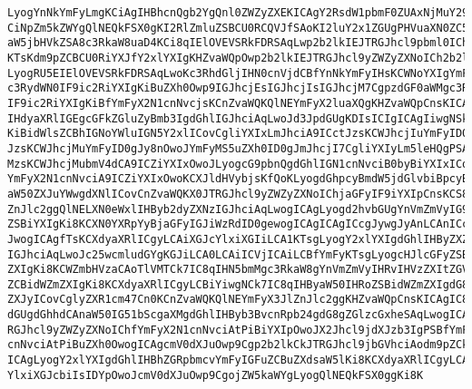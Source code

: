 \begin{verbatim}
LyogYnNkYmFyLmgKCiAgIHBhcnQgb2YgQnl0ZWZyZXEKICAgY2RsdW1pbmF0ZUAxNjMuY29tCiov
CiNpZm5kZWYgQlNEQkFSX0gKI2RlZmluZSBCU0RCQVJfSAoKI2luY2x1ZGUgPHVuaXN0ZC5oPgoj
aW5jbHVkZSA8c3RkaW8uaD4KCi8qIElOVEVSRkFDRSAqLwp2b2lkIEJTRGJhcl9pbml0ICh2b2lk
KTsKdm9pZCBCU0RiYXJfY2xlYXIgKHZvaWQpOwp2b2lkIEJTRGJhcl9yZWZyZXNoICh2b2lkKTsK
LyogRU5EIElOVEVSRkFDRSAqLwoKc3RhdGljIHN0cnVjdCBfYnNkYmFyIHsKCWNoYXIgYmFyOwoJ
c3RydWN0IF9ic2RiYXIgKiBuZXh0Owp9IGJhcjEsIGJhcjIsIGJhcjM7CgpzdGF0aWMgc3RydWN0
IF9ic2RiYXIgKiBfYmFyX2N1cnNvcjsKCnZvaWQKQlNEYmFyX2luaXQgKHZvaWQpCnsKICAgIC8q
IHdyaXRlIGEgcGFkZGluZyBmb3IgdGhlIGJhciAqLwoJd3JpdGUgKDIsICIgICAgIiwgNSk7Cgkv
KiBidWlsZCBhIGNoYWluIGN5Y2xlICovCgliYXIxLmJhciA9ICctJzsKCWJhcjIuYmFyID0gJ1xc
JzsKCWJhcjMuYmFyID0gJy8nOwoJYmFyMS5uZXh0ID0gJmJhcjI7CgliYXIyLm5leHQgPSAmYmFy
MzsKCWJhcjMubmV4dCA9ICZiYXIxOwoJLyogcG9pbnQgdGhlIGN1cnNvciB0byBiYXIxICovCglf
YmFyX2N1cnNvciA9ICZiYXIxOwoKCXJldHVybjsKfQoKLyogdGhpcyBmdW5jdGlvbiBpcyBmb3Ig
aW50ZXJuYWwgdXNlICovCnZvaWQKX0JTRGJhcl9yZWZyZXNoIChjaGFyIF9iYXIpCnsKCS8qIHJl
ZnJlc2ggQlNELXN0eWxlIHByb2dyZXNzIGJhciAqLwogICAgLyogd2hvbGUgYnVmZmVyIG9mIHRo
ZSBiYXIgKi8KCXN0YXRpYyBjaGFyIGJiWzRdID0gewogICAgICAgICcgJywgJyAnLCAnICcsICcg
JwogICAgfTsKCXdyaXRlICgyLCAiXGJcYlxiXGIiLCA1KTsgLyogY2xlYXIgdGhlIHByZXZpb3Vz
IGJhciAqLwoJc25wcmludGYgKGJiLCA0LCAiICVjICAiLCBfYmFyKTsgLyogcHJlcGFyZSBidWZm
ZXIgKi8KCWZmbHVzaCAoTlVMTCk7IC8qIHN5bmMgc3RkaW8gYnVmZmVyIHRvIHVzZXItZGVmaW5l
ZCBidWZmZXIgKi8KCXdyaXRlICgyLCBiYiwgNCk7IC8qIHByaW50IHRoZSBidWZmZXIgdG8gc3Rk
ZXJyICovCglyZXR1cm47Cn0KCnZvaWQKQlNEYmFyX3JlZnJlc2ggKHZvaWQpCnsKICAgIC8qIG5v
dGUgdGhhdCAnaW50IG51bScgaXMgdGhlIHByb3BvcnRpb24gdG8gZGlzcGxheSAqLwogICAgX0JT
RGJhcl9yZWZyZXNoIChfYmFyX2N1cnNvciAtPiBiYXIpOwoJX2Jhcl9jdXJzb3IgPSBfYmFyX2N1
cnNvciAtPiBuZXh0OwogICAgcmV0dXJuOwp9Cgp2b2lkCkJTRGJhcl9jbGVhciAodm9pZCkKewog
ICAgLyogY2xlYXIgdGhlIHBhZGRpbmcvYmFyIGFuZCBuZXdsaW5lKi8KCXdyaXRlICgyLCAiXGJc
YlxiXGJcbiIsIDYpOwoJcmV0dXJuOwp9CgojZW5kaWYgLyogQlNEQkFSX0ggKi8K
\end{verbatim}
